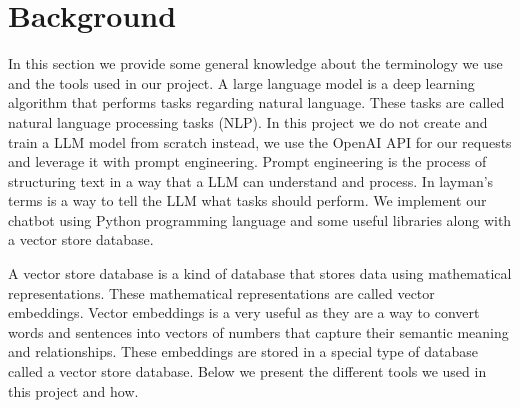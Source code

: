 \section{Background}
\label{sec:background}
In this section we provide some general knowledge about the terminology we use
and the tools used in our project.
A large language model is a deep learning algorithm that performs tasks
regarding
natural language. These tasks are called natural language processing tasks
(NLP). In this project we do not create and train a LLM model from scratch
instead, we use the OpenAI API for our requests and leverage it with prompt
engineering.
Prompt engineering is the process of structuring text in a way that a LLM can
understand and process. In layman's terms is a way to tell the LLM what tasks
should perform.
We implement our chatbot using Python programming language and some useful
libraries
along with a vector store database.

A vector store database is a kind of
database that stores data using mathematical representations. These
mathematical
representations are called vector embeddings. Vector embeddings is a very
useful
as they are a way to convert words and sentences into vectors of numbers that
capture
their semantic meaning and relationships. These embeddings are stored in a
special type of
database called a vector store database.
Below we present the different tools we used in this project and how.

